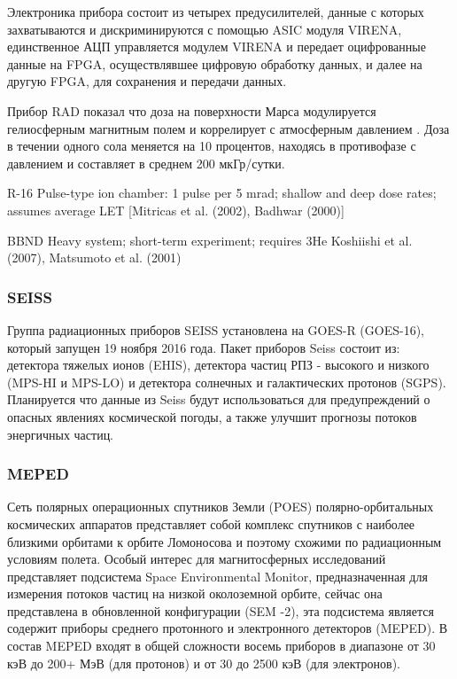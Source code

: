 Электроника прибора состоит из четырех предусилителей, данные с которых захватываются и дискриминируются с помощью ASIC модуля VIRENA, единственное АЦП управляется модулем VIRENA и передает оцифрованные данные на FPGA, осуществлявшее цифровую обработку данных, и далее на другую FPGA, для сохранения и передачи данных. 

Прибор RAD показал что доза на поверхности Марса модулируется гелиосферным магнитным полем и коррелирует с атмосферным давлением \cite{Guo2017}. Доза в течении одного сола меняется на 10 процентов, находясь в противофазе с давлением и составляет в среднем 200 мкГр/сутки.




R-16 Pulse-type ion chamber: 1 pulse per 5 mrad; shallow and deep dose rates; assumes average LET [Mitricas et al. (2002), Badhwar (2000)]


BBND Heavy system; short-term experiment; requires 3He Koshiishi et al. (2007), Matsumoto et al. (2001)

\subsubsection{SEISS}
Группа радиационных приборов SEISS установлена на GOES-R (GOES-16)\cite{Goodman2013}, который запущен 19 ноября 2016 года. 
Пакет приборов Seiss состоит из: детектора тяжелых ионов  (EHIS), детектора частиц РПЗ - высокого и низкого (MPS-HI и MPS-LO) и детектора солнечных и галактических протонов (SGPS). Планируется что данные из Seiss будут использоваться для предупреждений о опасных явлениях космической погоды, а также улучшит прогнозы потоков энергичных частиц. 

\subsubsection{MEPED}
Сеть полярных операционных спутников Земли (POES) полярно-орбитальных космических аппаратов представляет собой комплекс спутников с наиболее близкими орбитами к орбите Ломоносова и поэтому схожими по радиационным условиям полета. Особый интерес для магнитосферных исследований представляет подсистема Space Environmental Monitor, предназначенная для измерения потоков частиц на низкой околоземной орбите, сейчас она представлена ​​в обновленной конфигурации (SEM -2), эта подсистема является содержит приборы среднего протонного и электронного детекторов (MEPED).
В состав MEPED входят в общей сложности восемь приборов в диапазоне от 30 кэВ до 200+ МэВ (для протонов) и от 30 до 2500 кэВ (для электронов).

